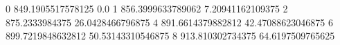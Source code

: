 0 849.1905517578125 0.0
1 856.3999633789062 7.20941162109375
2 875.2333984375 26.0428466796875
4 891.6614379882812 42.47088623046875
6 899.7219848632812 50.53143310546875
8 913.810302734375 64.6197509765625

